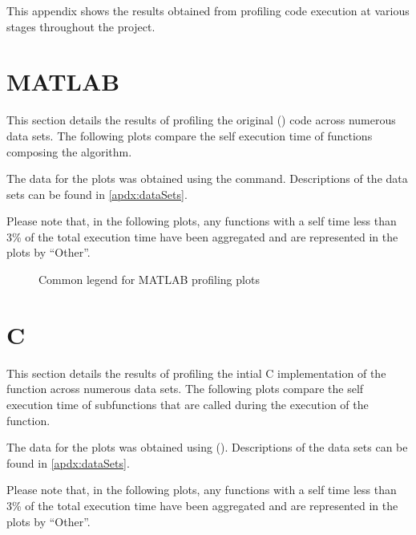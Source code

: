 This appendix shows the results obtained from profiling code execution at
various stages throughout the project.

\section{MATLAB}
\label{profiling:matlab}
This section details the results of profiling the original ()
code across numerous data sets. The following plots compare the self execution
time of functions composing the  algorithm.

The data for the plots was obtained using the 
 command. Descriptions of the data sets can be found in
\autoref{apdx:dataSets}.

Please note that, in the following plots, any functions with a self time less
than 3\% of the total execution time have been aggregated and are represented in
the plots by ``Other''.

\begin{figure}
    
    \caption{Common legend for MATLAB profiling plots}
    \label{profiling:matlab:legend}
\end{figure}



\section{C}
\label{profiling:c}
This section details the results of profiling the intial C implementation of the
 function across numerous data sets. The
following plots compare the self execution time of subfunctions that are called
during the execution of the  function.

The data for the plots was obtained using 
(). Descriptions of the data sets can be found in
\autoref{apdx:dataSets}.

Please note that, in the following plots, any functions with a self time less
than 3\% of the total execution time have been aggregated and are represented in
the plots by ``Other''.

